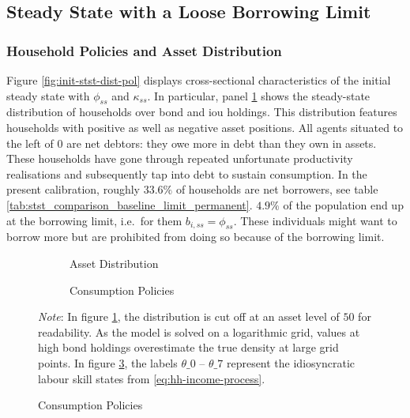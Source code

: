 \documentclass[12pt]{article} %
\numberwithin{equation}{section} %
\numberwithin{figure}{section}
\numberwithin{table}{section}
\begin{document}
\subsection{Steady State with a Loose Borrowing Limit}
\label{sec:limit-stst-loose}

\subsubsection*{Household Policies and Asset Distribution}

Figure \ref{fig:init-stst-dist-pol} displays cross-sectional characteristics of the initial steady state with $\phi_{ss}$ and $\kappa_{ss}$. In particular, panel \ref{fig:init-stst-dist-pol-a-dist} shows the steady-state distribution of households over bond and \Gls{iou} holdings. This distribution features households with positive as well as negative asset positions. All agents situated to the left of $0$ are net debtors: they owe more in debt than they own in assets. These households have gone through repeated unfortunate productivity realisations and subsequently tap into debt to sustain consumption. In the present calibration, roughly $33.6\%$ of households are net borrowers, see table \ref{tab:stst_comparison_baseline_limit_permanent}. $4.9\%$ of the population end up at the borrowing limit, i.e.~for them $b_{i,ss} = \phi_{ss}$. These individuals might want to borrow more but are prohibited from doing so because of the borrowing limit.

\begin{figure}[t]
    \caption{The Initial Steady State}
    \label{fig:init-stst-dist-pol}
    \centering
    \begin{subfigure}[b]{0.49\textwidth}
    \caption{Asset Distribution}
    \label{fig:init-stst-dist-pol-a-dist}
         \centering
         
     \end{subfigure}
     \hfill
     \begin{subfigure}[b]{0.49\textwidth}
     \caption{Consumption Policies}
     \label{fig:init-stst-dist-pol-c}
         \centering
         
     \end{subfigure}
     \begin{flushleft}
     \footnotesize
	\textit{Note}: In figure \ref{fig:init-stst-dist-pol-a-dist}, the distribution is cut off at an asset level of $50$ for readability. As the model is solved on a logarithmic grid, values at high bond holdings overestimate the true density at large grid points. In figure \ref{fig:init-stst-dist-pol-c}, the labels $\theta\_0$ -- $\theta\_7$ represent the idiosyncratic labour skill states from \eqref{eq:hh-income-process}.
	\end{flushleft}
\end{figure}
\end{document}
